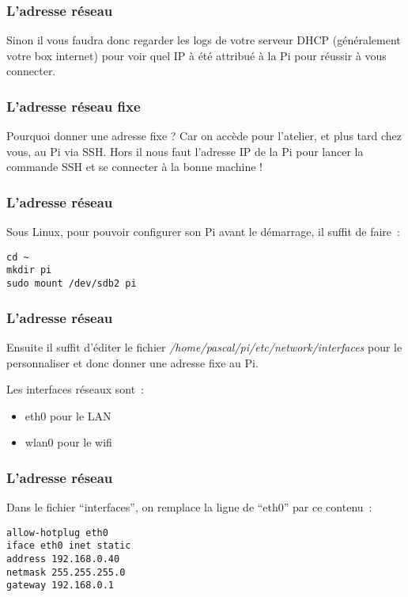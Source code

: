 \begin{frame}[containsverbatim]
\frametitle{L'adresse réseau}
Sinon il vous faudra donc regarder les logs de votre serveur DHCP (généralement votre box internet) pour voir quel IP à été attribué à la Pi pour réussir à vous connecter.
\end{frame}

\begin{frame}[containsverbatim]
\frametitle{L'adresse réseau fixe}
Pourquoi donner une adresse fixe ? Car on accède pour l'atelier, et plus tard chez vous, au Pi via SSH. Hors il nous faut l'adresse IP de la Pi pour lancer la commande SSH et se connecter à la bonne machine !

\end{frame}

\begin{frame}[containsverbatim]
\frametitle{L'adresse réseau}

Sous Linux, pour pouvoir configurer son Pi avant le démarrage, il suffit de faire~:
\begin{verbatim}
cd ~
mkdir pi
sudo mount /dev/sdb2 pi
\end{verbatim}
\end{frame}

\begin{frame}[containsverbatim]
\frametitle{L'adresse réseau}

Ensuite il suffit d'éditer le fichier \emph{/home/pascal/pi/etc/network/interfaces} pour le personnaliser et donc donner une adresse fixe au Pi.

Les interfaces réseaux sont~: 
\begin{itemize}
	\item eth0 pour le LAN 
	\item wlan0 pour le wifi 
\end{itemize}

\end{frame}


\begin{frame}[containsverbatim]
\frametitle{L'adresse réseau}

Dans le fichier ``interfaces'', on remplace la ligne de ``eth0'' par ce contenu~:
\begin{verbatim}
allow-hotplug eth0
iface eth0 inet static
address 192.168.0.40
netmask 255.255.255.0
gateway 192.168.0.1
\end{verbatim}

\end{frame}


